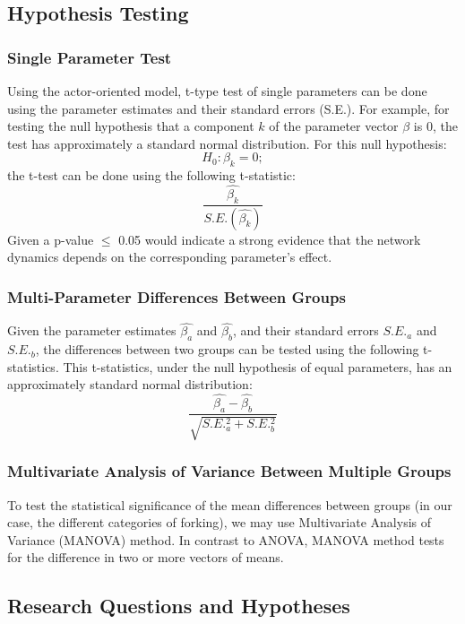 \documentclass[11pt]{report}
\begin{document}
\subsection{Hypothesis Testing}
\subsubsection{Single Parameter Test}
Using the actor-oriented model, t-type test of single parameters can be done using the parameter estimates and their standard errors (S.E.). 
For example, for testing the null hypothesis that a component $k$ of the parameter vector $\beta$ is 0, the test has approximately a standard normal distribution. For this null hypothesis: 
\begin{equation}
H_0: \beta_k = 0;
\end{equation}
the t-test can be done using the following t-statistic:
\begin{equation}
\frac{\hat{\beta_k}}{S.E.(\hat{\beta_k})}
\end{equation}
Given a p-value $\leq$ 0.05 would indicate a strong evidence that the network dynamics depends on the corresponding parameter's effect. 

\subsubsection{Multi-Parameter Differences Between Groups}

Given the parameter estimates $\hat{\beta_a}$ and $\hat{\beta_b}$, and their standard errors $S.E._a$ and $S.E._b$, the differences between two groups can be tested using the following t-statistics. This t-statistics, under the null hypothesis of equal parameters, has an approximately standard normal distribution:
\begin{equation}
\frac{\hat{\beta_a}-\hat{\beta_b}}{\sqrt{S.E._a^2 + S.E._b^2}}
\end{equation}

\subsubsection{Multivariate Analysis of Variance Between Multiple Groups}
To test the statistical significance of the mean differences between groups (in our case, the different categories of forking), we may use Multivariate Analysis of Variance (MANOVA) method. In contrast to ANOVA, MANOVA method tests for the difference in two or more vectors of means. 

\subsection{Research Questions and Hypotheses}
\label{RQs}
\end{document}
